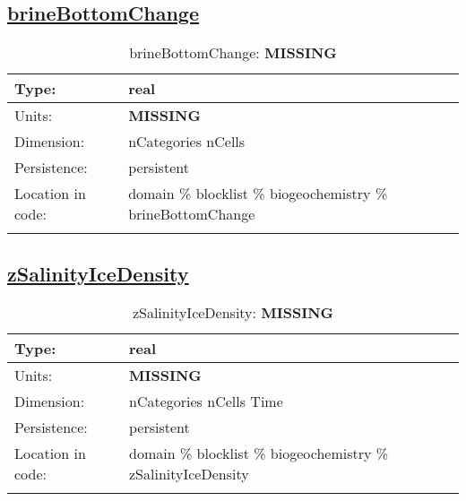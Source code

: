 \subsection[brineBottomChange]{\hyperref[sec:var_tab_biogeochemistry]{brineBottomChange}}
\label{subsec:var_sec_biogeochemistry_brineBottomChange}
\begin{center}
\begin{longtable}{| p{2.0in} | p{4.0in} |}
        \hline 
        Type: & real \\
        \hline 
        Units: & {\bf \color{red} MISSING} \\
        \hline 
        Dimension: & nCategories nCells \\
        \hline 
        Persistence: & persistent \\
        \hline 
         Location in code: & domain \% blocklist \% biogeochemistry \% brineBottomChange \\
         \hline 
    \caption{brineBottomChange: {\bf \color{red} MISSING}}
\end{longtable}
\end{center}
\subsection[zSalinityIceDensity]{\hyperref[sec:var_tab_biogeochemistry]{zSalinityIceDensity}}
\label{subsec:var_sec_biogeochemistry_zSalinityIceDensity}
\begin{center}
\begin{longtable}{| p{2.0in} | p{4.0in} |}
        \hline 
        Type: & real \\
        \hline 
        Units: & {\bf \color{red} MISSING} \\
        \hline 
        Dimension: & nCategories nCells Time \\
        \hline 
        Persistence: & persistent \\
        \hline 
         Location in code: & domain \% blocklist \% biogeochemistry \% zSalinityIceDensity \\
         \hline 
    \caption{zSalinityIceDensity: {\bf \color{red} MISSING}}
\end{longtable}
\end{center}
